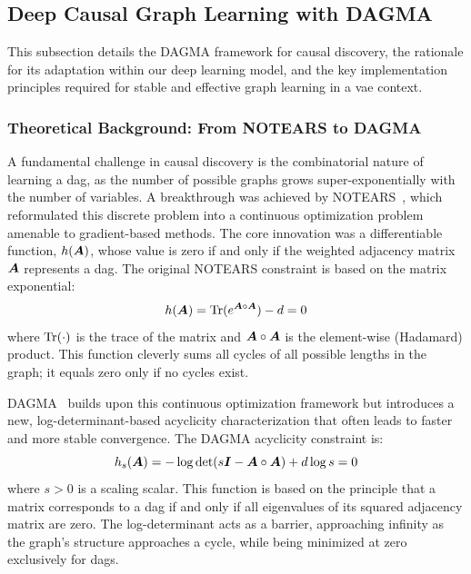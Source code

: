 \subsection{Deep Causal Graph Learning with DAGMA}
\label{app:dagma}

This subsection details the DAGMA framework for causal discovery, the rationale for its adaptation within our deep learning model, and the key implementation principles required for stable and effective graph learning in a \gls{vae} context.

\subsubsection{Theoretical Background: From NOTEARS to DAGMA}
\label{app:dagma:background}

A fundamental challenge in causal discovery is the combinatorial nature of learning a \gls{dag}, as the number of possible graphs grows super-exponentially with the number of variables.
A breakthrough was achieved by NOTEARS~\citep{zheng2018dags}, which reformulated this discrete problem into a continuous optimization problem amenable to gradient-based methods.
The core innovation was a differentiable function, $h({\bm{A}})$, whose value is zero if and only if the weighted adjacency matrix ${\bm{A}}$ represents a \gls{dag}.
The original NOTEARS constraint is based on the matrix exponential:
\begin{equation}
    h({\bm{A}}) = \operatorname{Tr}(e^{{\bm{A}} \circ {\bm{A}}}) - d = 0
    \label{eq:app:notears_constraint}
\end{equation}
where $\operatorname{Tr}(\cdot)$ is the trace of the matrix and ${\bm{A}} \circ {\bm{A}}$ is the element-wise (Hadamard) product.
This function cleverly sums all cycles of all possible lengths in the graph; it equals zero only if no cycles exist.

DAGMA~\citep{bello2022dagma} builds upon this continuous optimization framework but introduces a new, log-determinant-based acyclicity characterization that often leads to faster and more stable convergence.
The DAGMA acyclicity constraint is:
\begin{equation}
    h_s({\bm{A}}) = -\log\det(s{\bm{I}} - {\bm{A}} \circ {\bm{A}}) + d\log s = 0
    \label{eq:app:dagma_constraint}
\end{equation}
where $s>0$ is a scaling scalar.
This function is based on the principle that a matrix corresponds to a \gls{dag} if and only if all eigenvalues of its squared adjacency matrix are zero.
The log-determinant acts as a barrier, approaching infinity as the graph's structure approaches a cycle, while being minimized at zero exclusively for \glspl{dag}.

